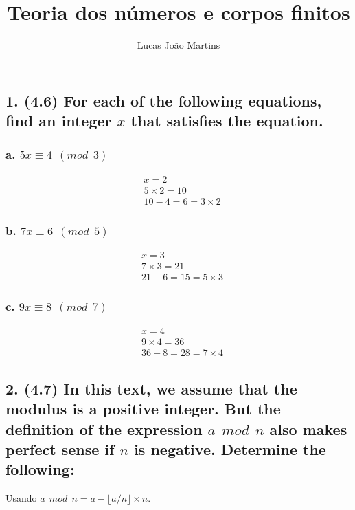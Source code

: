 \documentclass[fleqn, 12pt]{article}
\title{Teoria dos números e corpos finitos}
\author{Lucas João Martins}
\date{}
\begin{document}
\maketitle

\section*{}
\subsection*{1. (4.6) For each of the following equations, find an integer $x$
that satisfies the equation.}
  \subsubsection*{a. $5x \equiv 4 \ \ (mod \ \ 3)$}
    \begin{align*}
      & x = 2 \\
      & 5 \times 2 = 10 \\
      & 10 - 4 = 6 = 3 \times 2
    \end{align*}
  \subsubsection*{b. $7x \equiv 6 \ \ (mod \ \ 5)$}
    \begin{align*}
      & x = 3 \\
      & 7 \times 3 = 21 \\
      & 21 - 6 = 15 = 5 \times 3
    \end{align*}
  \subsubsection*{c. $9x \equiv 8 \ \ (mod \ \ 7)$}
    \begin{align*}
      & x = 4 \\
      & 9 \times 4 = 36 \\
      & 36 - 8 = 28 = 7 \times 4
    \end{align*}

\subsection*{2. (4.7) In this text, we assume that the modulus is a positive
integer. But the definition of the expression $a \ \ mod \ \ n$ also makes
 perfect sense if $n$ is negative. Determine the following:}

  Usando $a \ \ mod \ \ n = a - \lfloor a / n \rfloor \times n$.
\end{document}
